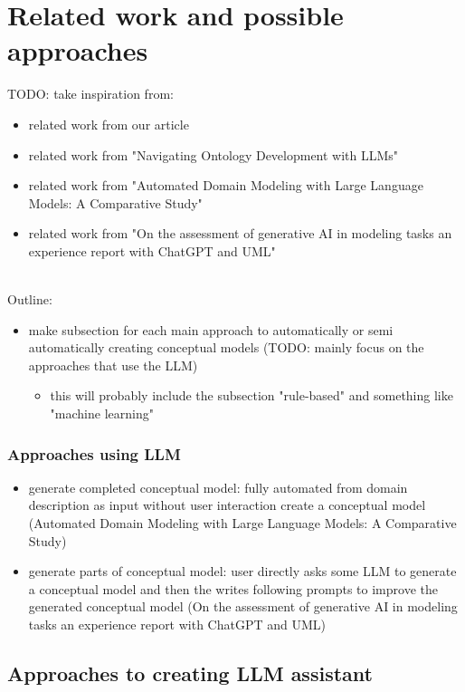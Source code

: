 \chapter{Related work and possible approaches}


TODO: take inspiration from:
\begin{itemize}
\item related work from our article
\item related work from "Navigating Ontology Development with LLMs"
\item related work from "Automated Domain Modeling with Large Language Models: A Comparative Study"
\item related work from "On the assessment of generative AI in modeling tasks an experience report with ChatGPT and UML" \\~\\
\end{itemize}

Outline:
\begin{itemize}
\item make subsection for each main approach to automatically or semi automatically creating conceptual models (TODO: mainly focus on the approaches that use the LLM)
\begin{itemize}
\item this will probably include the subsection "rule-based" and something like "machine learning"
\end{itemize}
\end{itemize}

\subsection*{Approaches using LLM}
\begin{itemize}
\item generate completed conceptual model: fully automated from domain description as input without user interaction create a conceptual model (Automated Domain Modeling with Large Language Models: A Comparative Study)
\item generate parts of conceptual model: user directly asks some LLM to generate a conceptual model and then the writes following prompts to improve the generated conceptual model (On the assessment of generative AI in modeling tasks an experience report with ChatGPT and UML)
\end{itemize}


\section*{Approaches to creating LLM assistant}

